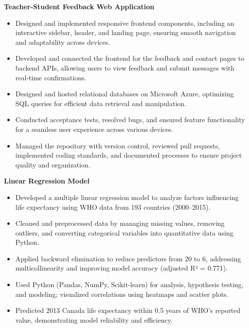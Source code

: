 \documentclass[10pt]{article}
\begin{document}
\textbf{Teacher-Student Feedback Web Application} 
\vspace{-4mm}
\begin{itemize}[left=0.15in, itemsep=0pt]
    \item Designed and implemented responsive frontend components, including an interactive sidebar, header, and landing page, ensuring smooth navigation and adaptability across devices.
    \item Developed and connected the frontend for the feedback and contact pages to backend APIs, allowing users to view feedback and submit messages with real-time confirmations.
    \item Designed and hosted relational databases on Microsoft Azure, optimizing SQL queries for efficient data retrieval and manipulation.
    \item Conducted acceptance tests, resolved bugs, and ensured feature functionality for a seamless user experience across various devices.
    \item Managed the repository with version control, reviewed pull requests, implemented coding standards, and documented processes to ensure project quality and organization.
\end{itemize}

\textbf{Linear Regression Model} 
\vspace{-4mm}
\begin{itemize}[left=0.15in, itemsep=0pt]
    \item Developed a multiple linear regression model to analyze factors influencing life expectancy using WHO data from 193 countries (2000–2015).
    \item Cleaned and preprocessed data by managing missing values, removing outliers, and converting categorical variables into quantitative data using Python.
    \item Applied backward elimination to reduce predictors from 20 to 6, addressing multicollinearity and improving model accuracy (adjusted R² = 0.771).
    \item Used Python (Pandas, NumPy, Scikit-learn) for analysis, hypothesis testing, and modeling; visualized correlations using heatmaps and scatter plots.
    \item Predicted 2013 Canada life expectancy within 0.5 years of WHO’s reported value, demonstrating model reliability and efficiency.
\end{itemize}

\end{document}

